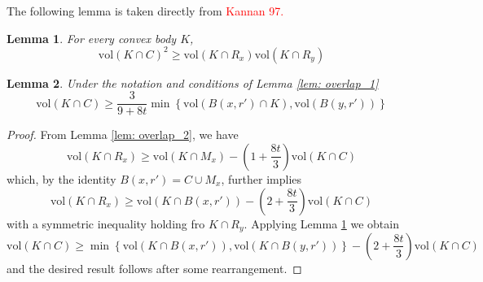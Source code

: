 \documentclass{article}
\newcommand{\vol}{\mathrm{vol}}
\newcommand{\set}[1]{\left\{#1\right\}}
\newcommand{\1}{\mathbf{1}}
\theoremstyle{alden}
\theoremstyle{aldenthm}
\newtheorem{lemma}{Lemma}
\theoremstyle{remark}
\begin{document}
The following lemma is taken directly from \textcolor{red}{Kannan 97.}

\begin{lemma}
	\label{lem: volume_log_concave}
	For every convex body $K$,
	\begin{equation*}
	\vol(K \cap C)^2 \geq \vol(K \cap R_x) \vol(K \cap R_y)
	\end{equation*}
\end{lemma}

\begin{lemma}
	\label{lem: overlap_3}
	Under the notation and conditions of Lemma \ref{lem: overlap_1}
	\begin{equation*}
	\vol(K \cap C) \geq \frac{3}{9 + 8t}\min \set{\vol(B(x,r') \cap K), \vol(B(y,r'))}
	\end{equation*}
\end{lemma}
\begin{proof}
	From Lemma \ref{lem: overlap_2}, we have
	\begin{equation*}
	\vol(K \cap R_x) \geq \vol(K \cap M_x) - (1 + \frac{8t}{3}) \vol(K \cap C)
	\end{equation*}
	which, by the identity $B(x,r') = C \cup M_x$, further implies
	\begin{equation*}
	\vol(K \cap R_x) \geq \vol(K \cap B(x,r')) - (2 + \frac{8t}{3}) \vol(K \cap C)
	\end{equation*}
	with a symmetric inequality holding fro $K \cap R_y$. Applying Lemma \ref{lem: volume_log_concave} we obtain
	\begin{equation*}
	\vol(K \cap C) \geq \min \set{\vol(K \cap B(x,r')), \vol(K \cap B(y,r'))} - (2 + \frac{8t}{3}) \vol(K \cap C)
	\end{equation*}
	and the desired result follows after some rearrangement.
\end{proof}
\end{document}
